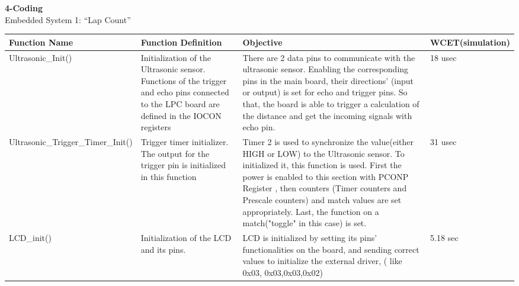 \documentclass{article}
\begin{document}
\clearpage
{\huge\textbf {4-Coding}}
\\
{\huge {Embedded System 1: “Lap Count”}}
\\
\begin{tabular}{| C{4cm} | C{4cm} | C{4cm} | C{2cm} |}
\hline
\textbf{Function Name} &\textbf{Function Definition}  & \textbf{Objective} &\textbf{WCET}\linebreak(simulation)\\
\hline
Ultrasonic\_Init() & Initialization of the Ultrasonic sensor. Functions of the trigger
and echo pins connected to the LPC board are defined in the IOCON registers& There are 2 data pins to
communicate with the ultrasonic sensor. Enabling the corresponding pins in the main board, their directions'
(input or output) is set for echo and trigger pins. So that, the board is able to trigger a calculation
of the distance and get the incoming signals with echo pin.& 18 usec\\
\hline
Ultrasonic\_Trigger\_Timer\_Init()&Trigger timer initializer. The output for the trigger pin is
 initialized in this function & Timer 2 is used to synchronize the value(either HIGH or LOW) to the Ultrasonic
 sensor. To initialized it, this function is used. First the power is enabled to this section with PCONP Register
 , then counters (Timer counters and Prescale counters) and match values are set appropriately. Last, the
 function on a match("toggle" in this case) is set. & 31 usec\\
\hline
LCD\_init()&Initialization of the LCD and its pins.& LCD is initialized by setting its pins' functionalities on the board,
and sending correct values to initialize the external driver, ( like 0x03, 0x03,0x03,0x02)&5.18 sec\\
\hline
\end{tabular}
\end{document}
